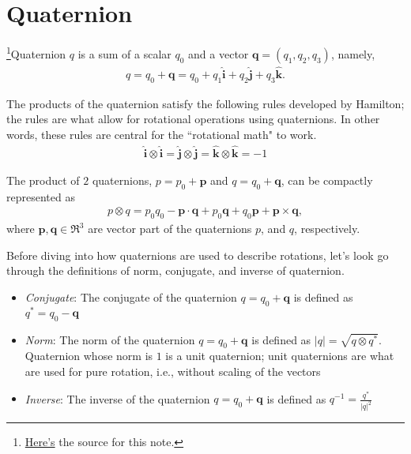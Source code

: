 \section{Quaternion}
\hspace{\parindent}\footnote{\href{https://faculty.sites.iastate.edu/jia/files/inline-files/quaternion.pdf}{Here's} the source for this note.}Quaternion $q$ is a sum of a scalar $q_0$ and a vector $\boldsymbol q = (q_1, q_2, q_3)$, namely,
\begin{align}
    q = q_0 + \boldsymbol q = q_0 + q_1 \boldsymbol{\hat i} + q_2 \boldsymbol{\hat j} + q_3 \boldsymbol{\hat k}.
    \label{eqn:quaternion}
\end{align}

The products of the quaternion satisfy the following rules developed by Hamilton; the rules are what allow for rotational operations using quaternions. In other words, these rules are central for the ``rotational math" to work.
\begin{align}
    \boldsymbol{\hat i} \otimes \boldsymbol{\hat i} = \boldsymbol{\hat j} \otimes \boldsymbol{\hat j} = \boldsymbol{\hat k} \otimes \boldsymbol{\hat k} = -1
    \label{eqn:quaternionProductRules}
\end{align}

The product of $2$ quaternions, $p = p_0 + \boldsymbol p$ and $q = q_0 + \boldsymbol q$, can be compactly represented as
\begin{align}
    p \otimes q = p_0 q_0 - \boldsymbol p \cdot \boldsymbol q + p_0 \boldsymbol q + q_0 \boldsymbol p + \boldsymbol p \times \boldsymbol q,
    \label{eqn:quaternionProduct}
\end{align}
where $\boldsymbol{p}, \boldsymbol{q} \in\Re^{3}$ are vector part of the quaternions $p$, and $q$, respectively.

Before diving into how quaternions are used to describe rotations, let's look go through the definitions of norm, conjugate, and inverse of quaternion.
\begin{itemize}
    \item \textit{Conjugate}: The conjugate of the quaternion $q = q_0 + \boldsymbol{q}$ is defined as $q^* = q_0 - \boldsymbol{q}$
    \item \textit{Norm}: The norm of the quaternion $q = q_0 + \boldsymbol{q}$ is defined as $|q| = \sqrt{q \otimes q^*}$. Quaternion whose norm is $1$ is a unit quaternion; unit quaternions are what are used for pure rotation, i.e., without scaling of the vectors
    \item \textit{Inverse}: The inverse of the quaternion $q = q_0 + \boldsymbol{q}$ is defined as $q^{-1} = \frac{q^*}{|q|^2}$
\end{itemize}


